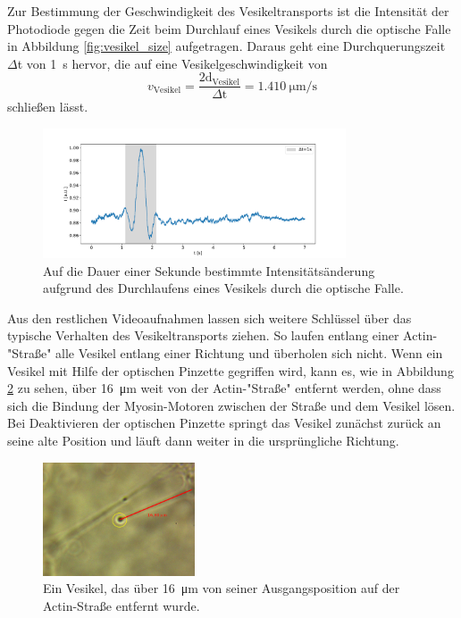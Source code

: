         \FloatBarrier
        \newpage
        Zur Bestimmung der Geschwindigkeit des Vesikeltransports ist die Intensität der Photodiode gegen die Zeit beim Durchlauf eines Vesikels durch die optische Falle in Abbildung 
        \ref{fig:vesikel_size} aufgetragen. Daraus geht eine Durchquerungszeit $\Delta$t von \SI{1}{\second} hervor, die auf eine Vesikelgeschwindigkeit von 
        \begin{equation*}
            v_{\text{Vesikel}} = \frac{2\text{d}_\text{Vesikel}}{\Delta\text{t}} = \SI{1.410}{\micro\metre\per\second}
        \end{equation*}
        schließen lässt.
        \FloatBarrier
        \begin{figure}[h]
        \centering
        \includegraphics[width = 0.8\textwidth]{v_vesikel.pdf}
        \caption{Auf die Dauer einer Sekunde bestimmte Intensitätsänderung aufgrund des Durchlaufens eines Vesikels durch die optische Falle.}
        \label{fig:v_vesikel}
        \end{figure}
        \FloatBarrier
        \newpage
        Aus den restlichen Videoaufnahmen lassen sich weitere Schlüssel über das typische Verhalten des Vesikeltransports ziehen. So laufen entlang einer Actin-"Straße" alle Vesikel entlang einer Richtung
        und überholen sich nicht. Wenn ein Vesikel mit Hilfe der optischen Pinzette gegriffen wird, kann es, wie in Abbildung \ref{fig:vesikel_abstand} zu sehen, über \SI{16}{\micro\metre} weit von der 
        Actin-"Straße" entfernt werden, ohne dass sich die Bindung der Myosin-Motoren zwischen der Straße und dem Vesikel lösen. Bei Deaktivieren der optischen Pinzette springt das Vesikel zunächst zurück 
        an seine alte Position und läuft dann weiter in die ursprüngliche Richtung. 
        \FloatBarrier
        \begin{figure}[h]
        \centering
        \includegraphics[width = 0.4\textwidth]{pictures/vesikel_abstand.png}
        \caption{Ein Vesikel, das über \SI{16}{\micro\metre} von seiner Ausgangsposition auf der Actin-Straße entfernt wurde.}
        \label{fig:vesikel_abstand}
        \end{figure}
